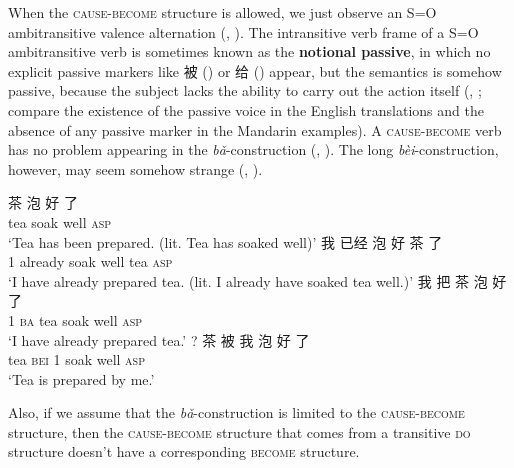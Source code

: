 \documentclass[UTF8, a4paper, oneside, scheme=plain, 12pt]{ctexrep}
\newcommand*{\concept}[1]{\textbf{#1}}
\newcommand{\form}[1]{\emph{#1}}
\newcommand{\translate}[1]{`#1'}
\newcommand*{\category}[1]{\textsc{#1}}
\begin{document}
When the \category{cause}-\category{become} structure is allowed, 
we just observe an S=O ambitransitive valence alternation
(, 
).
The intransitive verb frame of a S=O ambitransitive verb 
is sometimes known as the \concept{notional passive}, 
in which no explicit passive markers like 被 
()
or 给 () appear, 
but the semantics is somehow passive,
because the subject lacks the ability to carry out the action itself
(,
; 
compare the existence of the passive voice in the English translations
and the absence of any passive marker in the Mandarin examples).
A \category{cause}-\category{become} verb
has no problem appearing in the \form{bǎ}-construction
(, ).
The long \form{bèi}-construction, however, 
may seem somehow strange
(, ).

\begin{exe}
    \ex\label{ex:verb-phrase.notional-pass.1} 
    \gll 茶 泡 好 了 \\
    tea soak well \category{asp} \\
    \translate{Tea has been prepared.
    (lit. Tea has soaked well)}
    \ex\label{ex:verb-phrase.notional-pass.trans-1} 
    \gll 我 已经 泡 好 茶 了 \\
    1 already soak well tea \category{asp} \\
    \glt \translate{I have already prepared tea. (lit. I already have soaked tea well.)}
    \ex\label{ex:verb-phrase.notional-pass.ba-1}
    \gll 我 把 茶 泡 好 了 \\
    1 \category{ba} tea soak well \category{asp} \\
    \glt \translate{I have already prepared tea.}
    \ex\label{ex:verb-phrase.notional-pass.bei-1} 
    \gll ? 茶 被 我 泡 好 了 \\
    {} tea \category{bei} 1 soak well \category{asp} \\
    \glt \translate{Tea is prepared by me.}
\end{exe}

Also, if we assume that the \form{bǎ}-construction
is limited to the \category{cause}-\category{become} structure,
then the \category{cause}-\category{become} structure 
that comes from a transitive \category{do} structure 
doesn't have a corresponding \category{become} structure.
\end{document}
